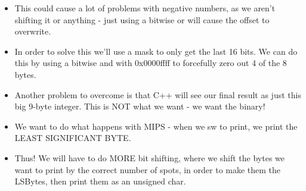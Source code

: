 \documentclass[12pt]{article}
\begin{document}
\begin{itemize}
    \item This could cause a lot of problems with negative numbers, as we aren't shifting it or anything - just using a bitwise or will cause the offset to overwrite. 
    \item In order to solve this we'll use a mask to only get the last 16 bits.  We can do this by using a bitwise and with 0x0000ffff to forcefully zero out 4 of the 8 bytes.
    \item Another problem to overcome is that C++ will see our final result as just this big 9-byte integer.  This is NOT what we want - we want the binary!
    \item We want to do what happens with MIPS - when we sw to print, we print the LEAST SIGNIFICANT BYTE.
    \item Thus!  We will have to do MORE bit shifting, where we shift the bytes we want to print by the correct number of spots, in order to make them the LSBytes, then print them as an unsigned char.
\end{itemize}
\end{document}
